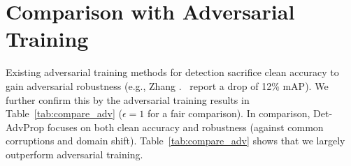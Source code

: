 \documentclass[final]{cvpr}
\begin{document}
\begin{table}[!htb]
\centering
{}
\smallskip
\caption{The performance of the detectors trained by Det-AdvProp + AutoAugment on PASCAL VOC.}
\vspace{-10pt}
\label{tab:ap-aa-voc}
\end{table}

\section{Comparison with Adversarial Training}
\label{app:adv}
Existing adversarial training methods for detection sacrifice clean accuracy to gain adversarial robustness (e.g.,
Zhang \etal.~\cite{zhang2019towards} report a drop of 12\% mAP). We further confirm this by the adversarial training results in Table~\ref{tab:compare_adv} ($\epsilon = 1$ for a fair comparison).
In comparison, Det-AdvProp focuses on both clean accuracy and robustness (against common corruptions and domain shift). Table~\ref{tab:compare_adv} shows that we largely outperform adversarial training.
\end{document}
